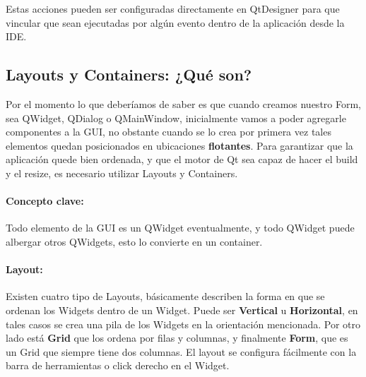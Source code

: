Estas acciones pueden ser configuradas directamente en QtDesigner para que vincular que sean
ejecutadas por alg\'un evento dentro de la aplicaci\'on desde la IDE.

\subsection{Layouts y Containers: ¿Qu\'e son?}
Por el momento lo que deber\'iamos de saber es que cuando creamos nuestro Form, sea QWidget, QDialog o QMainWindow, inicialmente vamos a poder
agregarle componentes a la GUI, no obstante cuando se lo crea por primera vez tales elementos quedan posicionados en ubicaciones \textbf{flotantes}.
Para garantizar que la aplicaci\'on quede bien ordenada, y que el motor de Qt sea capaz de hacer el build y el resize, es necesario utilizar Layouts y Containers.

\paragraph{Concepto clave:} Todo elemento de la GUI es un QWidget eventualmente, y todo QWidget puede albergar otros QWidgets, esto lo convierte en un container.

\paragraph{Layout:} Existen cuatro tipo de Layouts, b\'asicamente describen la forma en que se ordenan los Widgets dentro de un Widget. Puede ser \textbf{Vertical} u \textbf{Horizontal},
en tales casos se crea una pila de los Widgets en la orientaci\'on mencionada. Por otro lado est\'a \textbf{Grid} que los ordena por filas y columnas, y finalmente \textbf{Form}, que es un Grid
que siempre tiene dos columnas. El layout se configura f\'acilmente con la barra de herramientas o click derecho en el Widget.

